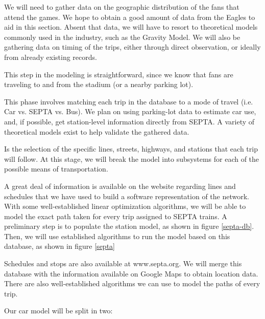 \documentclass[12pt]{article}
\begin{document}
\begin{description}[style=nextline]
    \item[Trip Generation] We will need to gather data on the
  geographic distribution of the fans that attend the games. We hope
  to obtain a good amount of data from the Eagles to aid in this
  section. Absent that data, we will have to resort to theoretical
  models commonly used in the industry, such as the Gravity Model. We
  will also be gathering data on timing of the trips, either through
  direct observation, or ideally from already existing records.
    \item[Trip Distribution] This step in the modeling is
  straightforward, since we know that fans are traveling to and from
  the stadium (or a nearby parking lot).
    \item[Mode Choice] This phase involves matching each trip in the
  database to a mode of travel (i.e. Car vs. SEPTA vs. Bus). We plan
  on using parking-lot data to estimate car use, and, if possible, get
  station-level information directly from SEPTA. A variety of
  theoretical models exist to help validate the gathered data.
    \item[Trip Assignment] Is the selection of the specific lines,
  streets, highways, and stations that each trip will follow. At this
  stage, we will break the model into subsystems for each of the
  possible means of transportation.
    \begin{description}[style=nextline]
        \item[Trains] A great deal of information is available on the
      website regarding lines and schedules that we have used to build
      a software representation of the network. With some
      well-established linear optimization algorithms, we will be able
      to model the exact path taken for every trip assigned to SEPTA
      trains. A preliminary step is to populate the station model, as
      shown in figure \ref{septa-db}. Then, we will use established
      algorithms to run the model based on this database, as shown in
      figure \ref{septa}
        \item[Buses] Schedules and stops are also available at
      www.septa.org. We will merge this database with the
      information available on Google Maps to obtain location data.
      There are also well-established algorithms we can use to model
      the paths of every trip.
        \item[Cars] Our car model will be split in two: \label{cars}
      \begin{itemize}

\end{itemize}
\end{description}
\end{description}
\end{document}
